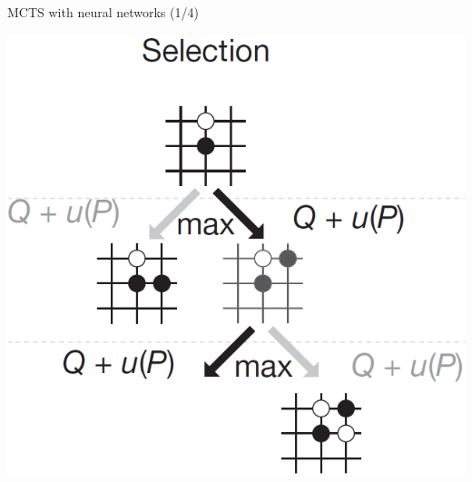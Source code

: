 \documentclass{beamer}
\begin{document}
{    \begin{frame}{MCTS with neural networks (1/4)}
      \begin{center}
        \includegraphics[height=.85\textheight]{../img/MCTS_selection.png}
      \end{center}
    \end{frame}

}
\end{document}
